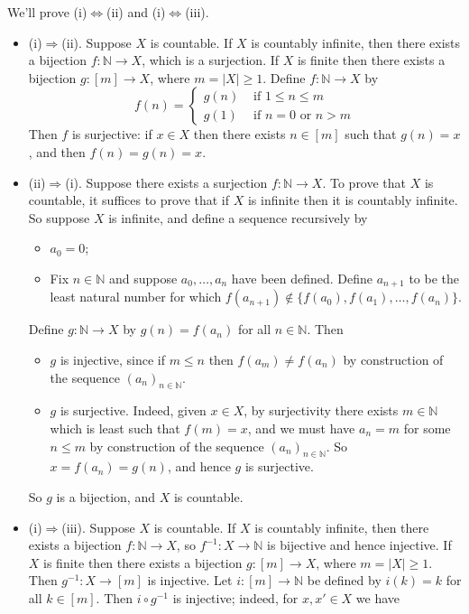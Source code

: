 \begin{cproof}
We'll prove (i)$\Leftrightarrow$(ii) and (i)$\Leftrightarrow$(iii).
\begin{itemize}
\item (i)$\Rightarrow$(ii). Suppose $X$ is countable. If $X$ is countably infinite, then there exists a bijection $f : \mathbb{N} \to X$, which is a surjection. If $X$ is finite then there exists a bijection $g : [m] \to X$, where $m = |X| \ge 1$. Define $f : \mathbb{N} \to X$ by
\[ f(n) = \begin{cases} g(n) & \text{ if } 1 \le n \le m \\ g(1) & \text{ if } n=0 \text{ or } n > m \end{cases} \]
Then $f$ is surjective: if $x \in X$ then there exists $n \in [m]$ such that $g(n)=x$, and then  $f(n)=g(n)=x$.
\item (ii)$\Rightarrow$(i). Suppose there exists a surjection $f : \mathbb{N} \to X$. To prove that $X$ is countable, it suffices to prove that if $X$ is infinite then it is countably infinite. So suppose $X$ is infinite, and define a sequence recursively by
\begin{itemize}
\item $a_0=0$;
\item Fix $n \in \mathbb{N}$ and suppose $a_0, \dots, a_n$ have been defined. Define $a_{n+1}$ to be the least natural number for which $f(a_{n+1}) \not \in \{ f(a_0), f(a_1), \dots, f(a_n) \}$.
\end{itemize}
Define $g : \mathbb{N} \to X$ by $g(n)=f(a_n)$ for all $n \in \mathbb{N}$. Then
\begin{itemize}
\item $g$ is injective, since if $m \le n$ then $f(a_m) \ne f(a_n)$ by construction of the sequence $(a_n)_{n \in \mathbb{N}}$.
\item $g$ is surjective. Indeed, given $x \in X$, by surjectivity there exists $m \in \mathbb{N}$ which is least such that $f(m)=x$, and we must have $a_n=m$ for some $n \le m$ by construction of the sequence $(a_n)_{n \in \mathbb{N}}$. So $x = f(a_n) = g(n)$, and hence $g$ is surjective.
\end{itemize}
So $g$ is a bijection, and $X$ is countable.
\item (i)$\Rightarrow$(iii). Suppose $X$ is countable. If $X$ is countably infinite, then there exists a bijection $f : \mathbb{N} \to X$, so $f^{-1} : X \to \mathbb{N}$ is bijective and hence injective. If $X$ is finite then there exists a bijection $g : [m] \to X$, where $m=|X| \ge 1$. Then $g^{-1} : X \to [m]$ is injective. Let $i : [m] \to \mathbb{N}$ be defined by $i(k)=k$ for all $k \in [m]$. Then $i \circ g^{-1}$ is injective; indeed, for $x,x' \in X$ we have

\end{itemize}
\end{cproof}
